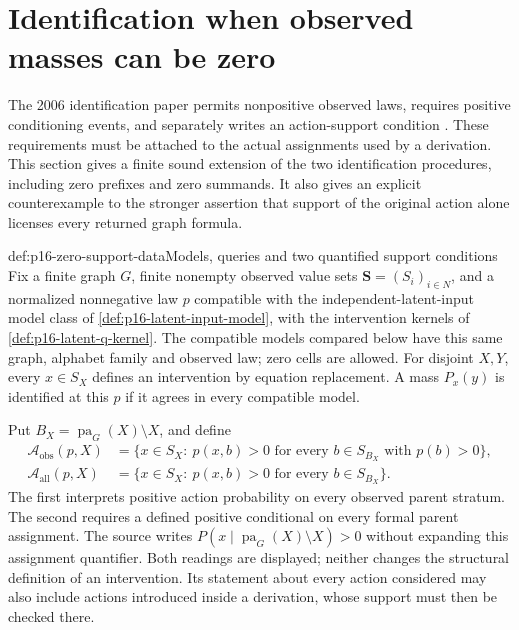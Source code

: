 \section{Identification when observed masses can be zero}
\label{sec:p16-identification-with-zero-support}

The 2006 identification paper permits nonpositive observed laws, requires
positive conditioning events, and separately writes an action-support
condition \cite[p.~1220 and Lemma~1, p.~1221]{ShpitserPearl2006JointIdentification}.
These requirements must be attached to the actual assignments used by
a derivation. This section gives a finite sound extension of the two
identification procedures, including zero prefixes and zero summands.
It also gives an explicit counterexample to the stronger assertion that
support of the original action alone licenses every returned graph formula.

\begin{hbdefinition}{def:p16-zero-support-data}{Models, queries and two quantified support conditions}
Fix a finite graph \(G\), finite nonempty observed value sets
\(\mathbf S=(S_i)_{i\in N}\), and a normalized nonnegative law
\(p\) compatible with the independent-latent-input model class of
\cref{def:p16-latent-input-model}, with the intervention kernels of
\cref{def:p16-latent-q-kernel}.
The compatible models compared below have this same graph, alphabet
family and observed law; zero cells are allowed. For disjoint
\(X,Y\), every \(x\in S_X\) defines an intervention by
equation replacement. A mass \(P_x(y)\) is identified at this
\(p\) if it agrees in every compatible model.

Put \(B_X=\operatorname{pa}_G(X)\setminus X\), and define
\[
 \begin{split}
 \mathcal A_{\mathrm{obs}}(p,X)
   &=\{x\in S_X:\ p(x,b)>0\text{ for every }b\in S_{B_X}
                                     \text{ with }p(b)>0\},\\
 \mathcal A_{\mathrm{all}}(p,X)
   &=\{x\in S_X:\ p(x,b)>0\text{ for every }b\in S_{B_X}\}.
 \end{split}
\]
The first interprets positive action probability on every observed
parent stratum. The second requires a defined positive conditional
on every formal parent assignment. The source writes
\(P(x\mid\operatorname{pa}_G(X)\setminus X)>0\) without
expanding this assignment quantifier. Both readings are displayed;
neither changes the structural definition of an intervention.
Its statement about every action considered may also include actions
introduced inside a derivation, whose support must then be checked there.
\end{hbdefinition}

